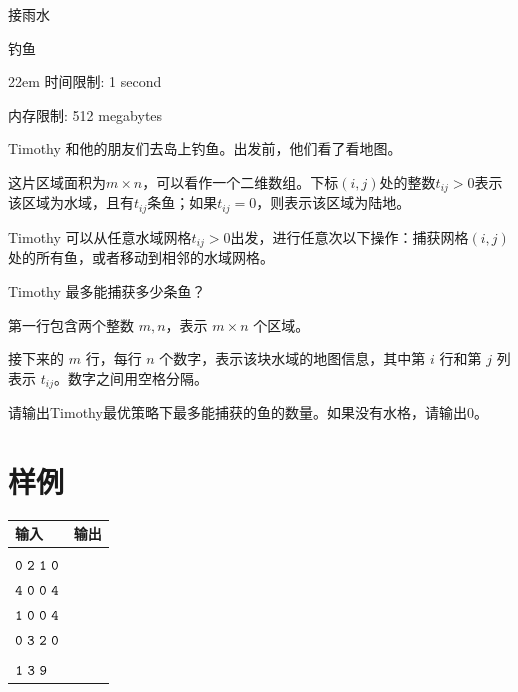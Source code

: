 \documentclass{xcpczh}
\begin{document}
\begin{problem}{接雨水}
	\end{problem}
	
	\begin{problem}{钓鱼}
		\begin{boxedminipage}[c][1.5cm][t]{22em} 
			时间限制: 1 second
			
			内存限制: 512 megabytes
		\end{boxedminipage}
		
		Timothy 和他的朋友们去岛上钓鱼。出发前，他们看了看地图。
		
		这片区域面积为$m \times n$，可以看作一个二维数组。下标$(i, j)$处的整数$t_{ij}>0$表示该区域为水域，且有$t_{ij}$条鱼；如果$t_{ij}=0$，则表示该区域为陆地。
		
		Timothy 可以从任意水域网格$t_{ij}>0$出发，进行任意次以下操作：捕获网格$(i, j)$处的所有鱼，或者移动到相邻的水域网格。
		
		Timothy 最多能捕获多少条鱼？
		
		
		\begin{inputdes}
			第一行包含两个整数 $m,n$，表示 $m\times n$ 个区域。
			
			接下来的 $m$ 行，每行 $n$ 个数字，表示该块水域的地图信息，其中第 $i$ 行和第 $j$ 列表示 $t_{ij}$。数字之间用空格分隔。
		\end{inputdes}
		
		\begin{outputdes}
			请输出Timothy最优策略下最多能捕获的鱼的数量。如果没有水格，请输出0。
		\end{outputdes}
		
		\section*{样例}
		
		\begin{table}[h]
			\begin{tabular}{|l|l|}
				\hline
				\textbf{输入} & \textbf{输出} \\ \hline
				\makecell[l]{$\tt{4\ 4}$\\$\tt{0\ 2\ 1\ 0}$\\$\tt{4\ 0\ 0\ 4}$\\$\tt{1\ 0\ 0\ 4}$\\$\tt{0\ 3\ 2\ 0}$} & \makecell[l]{$\tt{7}$} \\ \hline
				\makecell[l]{$\tt{1 3}$\\$\tt{1\ 3\ 9}$} & \makecell[l]{$\tt{13}$} \\ \hline
			\end{tabular}
		\end{table}
		

\end{problem}
\end{document}
